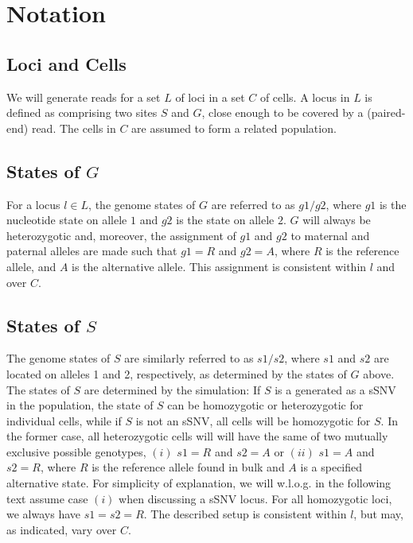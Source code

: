 \documentclass[a4paper,11pt]{article}
\begin{document}

\section{Notation}
\label{sec:notation}

\subsection{Loci and Cells}
\label{sec:loci-cells}

We will generate reads for a set $L$ of loci in a set $C$ of cells. A
locus in $L$ is defined as comprising two sites $S$ and $G$, close
enough to be covered by a (paired-end) read. The cells in $C$ are
assumed to form a related population.


\subsection{States of $G$}
\label{sec:states-g}


For a locus $l\in L$, the genome states of $G$ are referred to as
$g1/g2$, where $g1$ is the nucleotide state on allele $1$ and $g2$ is
the state on allele $2$.  $G$ will always be heterozygotic and,
moreover, the assignment of $g1$ and $g2$ to maternal and paternal
alleles are made such that $g1=R$ and $g2=A$, where $R$ is the
reference allele, and $A$ is the alternative
allele. This assignment is consistent within
$l$ and over $C$.

\subsection{States of $S$}
\label{sec:states-s}

The genome states of $S$ are similarly referred to as $s1/s2$, where
$s1$ and $s2$ are located on alleles 1 and 2, respectively, as
determined by the states of $G$ above. The states of $S$ are
determined by the simulation: If $S$ is a generated as a sSNV in the
population, the state of $S$ can be homozygotic or heterozygotic for
individual cells, while if $S$ is not an sSNV, all cells will be
homozygotic for $S$.  In the former case, all heterozygotic cells will
will have the same of two mutually exclusive possible genotypes, $(i)$
$s1=R$ and $s2=A$ or $(ii)$ $s1=A$ and $s2=R$, where $R$ is the
reference allele found in bulk and $A$ is a specified alternative
state. For simplicity of explanation, we will w.l.o.g. in the
following text assume case $(i)$ when discussing a sSNV locus. For all
homozygotic loci, we always have $s1=s2=R$. The described setup is
consistent within $l$, but may, as indicated, vary over $C$.
\end{document}
